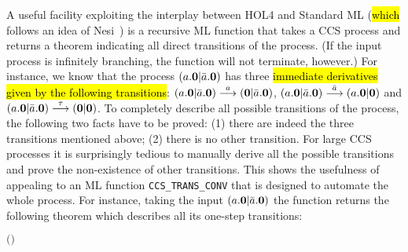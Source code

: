 A useful facility exploiting the interplay
between HOL4 and Standard ML (\hl{which} follows an idea of Nesi~\cite{Nesi:1992ve})
 is a recursive ML function that takes a CCS process and returns a theorem indicating all
  direct transitions of the process. (If the input process is
 infinitely branching, the function will not terminate, however.)
For instance, we know that the process $(a.{\boldsymbol 0} | \bar{a}.{\boldsymbol 0})$ has three
\hl{immediate derivatives given by the following transitions}:
$(a.{\boldsymbol 0} | \bar{a}.{\boldsymbol 0}) \overset{a}{\longrightarrow}
({\boldsymbol 0} | \bar{a}.{\boldsymbol 0})$, $(a.{\boldsymbol 0} | \bar{a}.{\boldsymbol 0})
\overset{\bar{a}}{\longrightarrow} (a.{\boldsymbol 0} | {\boldsymbol 0})$ and $(a.{\boldsymbol 0} | \bar{a}.{\boldsymbol 0})
\overset{\tau}{\longrightarrow} ({\boldsymbol 0} | {\boldsymbol 0})$.
To completely describe all possible transitions of the process, the
following two facts have to be proved: (1) there are indeed the three
  transitions mentioned above; (2) there is no other
  transition. For large CCS processes it is surprisingly tedious to manually derive
all the possible transitions and prove the non-existence of other transitions.
This shows the usefulness of appealing to an ML function
\texttt{CCS\_TRANS\_CONV} that is designed to automate the whole process.
For instance, taking the input $(a.{\boldsymbol 0} | \bar{a}.{\boldsymbol 0})$ the function returns the
following theorem which describes all its one-step transitions:
\begin{alltt}
\HOLTokenTurnstile{} \HOLConst{\HOLTokenInputAct} \HOLSymConst{\ensuremath{\ldotp}} \HOLSymConst{\ensuremath{\mid}} \HOLConst{\HOLTokenOutputAct} \HOLSymConst{\ensuremath{\ldotp}} \HOLTokenTransBegin{}\HOLTokenTransEnd {} \HOLSymConst{\HOLTokenEquiv{}}
   \ensuremath{(} \HOLSymConst{\ensuremath{=}} \HOLConst{\HOLTokenInputAct}  \HOLSymConst{\HOLTokenConj{}}  \HOLSymConst{\ensuremath{=}}  \HOLSymConst{\ensuremath{\mid}} \HOLConst{\HOLTokenOutputAct} \HOLSymConst{\ensuremath{\ldotp}} \HOLSymConst{\HOLTokenDisj{}}  \HOLSymConst{\ensuremath{=}} \HOLConst{\HOLTokenOutputAct}  \HOLSymConst{\HOLTokenConj{}}  \HOLSymConst{\ensuremath{=}} \HOLConst{\HOLTokenInputAct} \HOLSymConst{\ensuremath{\ldotp}} \HOLSymConst{\ensuremath{\mid}} \ensuremath{)} \HOLSymConst{\HOLTokenDisj{}}
    \HOLSymConst{\ensuremath{=}} \HOLSymConst{\ensuremath{\tau}} \HOLSymConst{\HOLTokenConj{}}  \HOLSymConst{\ensuremath{=}}  \HOLSymConst{\ensuremath{\mid}} 
\end{alltt}

